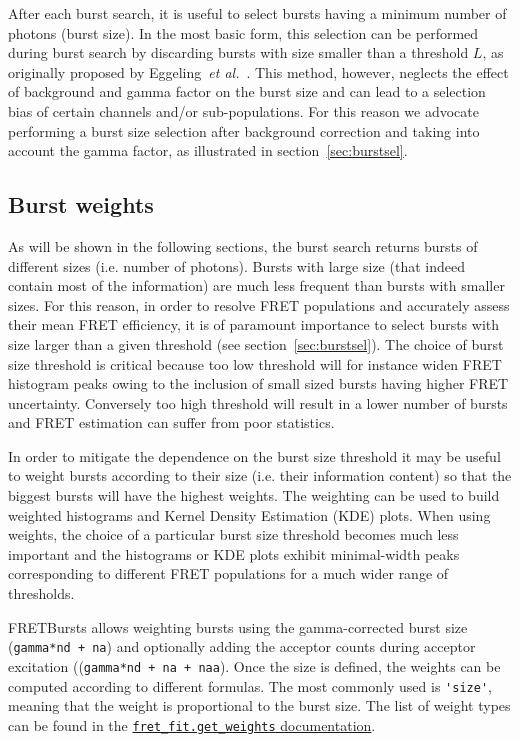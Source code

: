 After each burst search, it is useful to select
bursts having a minimum number of photons (burst size). In the most
basic form, this selection can be performed during burst search by discarding
bursts with size smaller than a threshold $L$, as originally proposed by
Eggeling~\textit{et al.}~\cite{Eggeling_1998}.
This method, however, neglects the effect
of background and gamma factor on the burst size and can lead to a selection
bias of certain channels and/or sub-populations.
For this reason we advocate performing a burst size selection after background
correction and taking into account the gamma factor, as illustrated in
section~\ref{sec:burstsel}.


\subsection{Burst weights}

As will be shown in the following sections, the burst search returns bursts of different sizes (i.e. number of photons).
Bursts with large size (that indeed contain most of the information)
are much less frequent than bursts with smaller sizes. For this reason, in order
to resolve FRET populations and accurately assess their mean FRET efficiency, it is of
paramount importance to select bursts with size larger than a given threshold (see
section~\ref{sec:burstsel}). The choice of burst size threshold is
critical because too low threshold will for instance widen FRET histogram peaks owing to the
inclusion of small sized bursts having higher FRET uncertainty. Conversely
too high threshold will result in a lower number of bursts and FRET estimation
can suffer from poor statistics.

In order to mitigate the dependence on the burst size threshold it may be
useful to weight bursts according to their size (i.e. their
information content) so that the biggest bursts will have the highest weights.
The weighting can be used to build weighted histograms and Kernel Density Estimation (KDE) plots.
When using weights, the choice of a particular burst size threshold becomes
much less important and the histograms or KDE plots exhibit minimal-width
peaks corresponding to different FRET populations for a much wider range
of thresholds.

FRETBursts allows weighting bursts using the gamma-corrected burst size
(\verb|gamma*nd + na|) and optionally adding the acceptor counts during
acceptor excitation ((\verb|gamma*nd + na + naa|). Once the size is defined, the weights
can be computed according to different formulas. The most
commonly used is \verb|'size'|, meaning that the weight
is proportional to the burst size. The list of weight types
can be found in the
\href{http://fretbursts.readthedocs.org/en/latest/fret_fit.html#fretbursts.fret_fit.get_weights}{\texttt{fret\_fit.get\_weights} documentation}.

